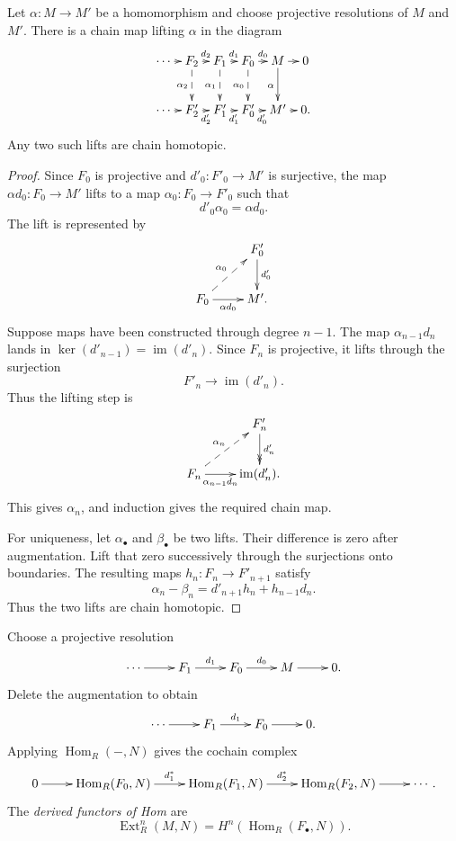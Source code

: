 \begin{theorem}
\label{at-theorem-resolution-comparison}
Let $\alpha:M\to M'$ be a homomorphism and
choose projective resolutions of $M$ and
$M'$.  There is a chain map lifting
$\alpha$ in the diagram
$$
\xymatrix@C=.55em{
\cdots \ar[r]
  & F_2 \ar[r]^-{d_2}
    \ar@{-->}[d]_{\alpha_2}
  & F_1 \ar[r]^-{d_1}
    \ar@{-->}[d]_{\alpha_1}
  & F_0 \ar[r]^-{d_0}
    \ar@{-->}[d]_{\alpha_0}
  & M \ar[r] \ar[d]_\alpha
  & 0 \\
\cdots \ar[r]
  & F'_2 \ar[r]_-{d'_2}
  & F'_1 \ar[r]_-{d'_1}
  & F'_0 \ar[r]_-{d'_0}
  & M' \ar[r]
  & 0.
}
$$
Any two such lifts are chain homotopic.
\end{theorem}

\begin{proof}
Since $F_0$ is projective and
$d'_0:F'_0\longrightarrow M'$ is
surjective, the map
$\alpha d_0:F_0\longrightarrow M'$ lifts
to a map
$\alpha_0:F_0\longrightarrow F'_0$ such
that
$$
d'_0\alpha_0=\alpha d_0.
$$
The lift is represented by
$$
\xymatrix{
  & F'_0 \ar[d]^{d'_0} \\
F_0 \ar[r]_-{\alpha d_0}
  \ar@{-->}[ur]^{\alpha_0}
  & M'.
}
$$
Suppose maps have been constructed through
degree $n-1$.  The map
$\alpha_{n-1}d_n$ lands in
$\ker(d'_{n-1})=\operatorname{im}(d'_n)$.
Since $F_n$ is projective, it lifts through
the surjection
$$
F'_n\longrightarrow\operatorname{im}(d'_n).
$$
Thus the lifting step is
$$
\xymatrix{
  & F'_n \ar@{->>}[d]^{d'_n} \\
F_n \ar[r]_-{\alpha_{n-1}d_n}
  \ar@{-->}[ur]^{\alpha_n}
  & \operatorname{im}(d'_n).
}
$$
This gives $\alpha_n$, and induction gives
the required chain map.

\noindent
For uniqueness, let $\alpha_\bullet$ and
$\beta_\bullet$ be two lifts.  Their
difference is zero after augmentation.
Lift that zero successively through the
surjections onto boundaries.  The resulting
maps $h_n:F_n\to F'_{n+1}$ satisfy
$$
\alpha_n-\beta_n
=d'_{n+1}h_n+h_{n-1}d_n.
$$
Thus the two lifts are chain homotopic.
\end{proof}

\begin{definition}
\label{at-definition-ext}
Choose a projective resolution
$$
\xymatrix{
\cdots \ar[r]
  & F_1 \ar[r]^-{d_1}
  & F_0 \ar[r]^-{d_0}
  & M \ar[r]
  & 0.
}
$$
Delete the augmentation to obtain
$$
\xymatrix{
\cdots \ar[r]
  & F_1 \ar[r]^-{d_1}
  & F_0 \ar[r]
  & 0.
}
$$
Applying $\operatorname{Hom}_R(-,N)$ gives
the cochain complex
$$
\xymatrix{
0 \ar[r]
  & \operatorname{Hom}_R(F_0,N)
    \ar[r]^-{d_1^*}
  & \operatorname{Hom}_R(F_1,N)
    \ar[r]^-{d_2^*}
  & \operatorname{Hom}_R(F_2,N)
    \ar[r]
  & \cdots.
}
$$
The {\it derived functors of Hom} are
$$
\operatorname{Ext}^n_R(M,N)
=
H^n(\operatorname{Hom}_R(F_\bullet,N)).
$$
\end{definition}

